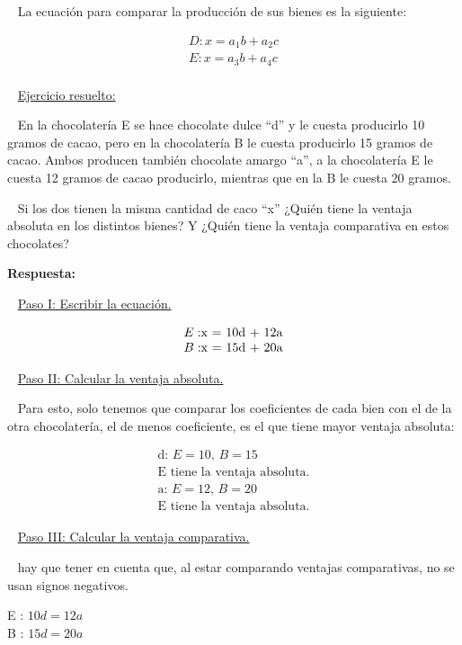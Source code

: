\documentclass[
  letterpaper,
  DIV=11,
  numbers=noendperiod]{scrreport}
\begin{document}
~ La ecuación para comparar la producción de sus bienes es la siguiente:

\[
\begin{matrix}
D: x = a_1 b + a_2 c\\
E: x = a_3 b + a_4 c\\
\end{matrix}
\]

~ \ul{Ejercicio resuelto:}

~ En la chocolatería E se hace chocolate dulce ``d'' y le cuesta
producirlo 10 gramos de cacao, pero en la chocolatería B le cuesta
producirlo 15 gramos de cacao. Ambos producen también chocolate amargo
``a'', a la chocolatería E le cuesta 12 gramos de cacao producirlo,
mientras que en la B le cuesta 20 gramos.

~ Si los dos tienen la misma cantidad de caco ``x'' ¿Quién tiene la
ventaja absoluta en los distintos bienes? Y ¿Quién tiene la ventaja
comparativa en estos chocolates?

\textbf{Respuesta:}

~ \ul{Paso I: Escribir la ecuación.}

\[
\begin{matrix}    E: $x = 10d + 12a$ \\    B: $x = 15d + 20a$\end{matrix}
\]

~ \ul{Paso II: Calcular la ventaja absoluta.}

~ Para esto, solo tenemos que comparar los coeficientes de cada bien con
el de la otra chocolatería, el de menos coeficiente, es el que tiene
mayor ventaja absoluta:

\[
\begin{matrix}    \text{d: $E = 10$, $B = 15$} \\    \text{E tiene la ventaja absoluta.}\\    \text{a: $E = 12$, $B = 20$} \\    \text{E tiene la ventaja absoluta.}\end{matrix}
\]

~ \ul{Paso III: Calcular la ventaja comparativa.}

~ hay que tener en cuenta que, al estar comparando ventajas
comparativas, no se usan signos negativos.

\begin{center}
        E : $10d = 12a$ \\
        B : $15d = 20a$
\end{center}
\end{document}

